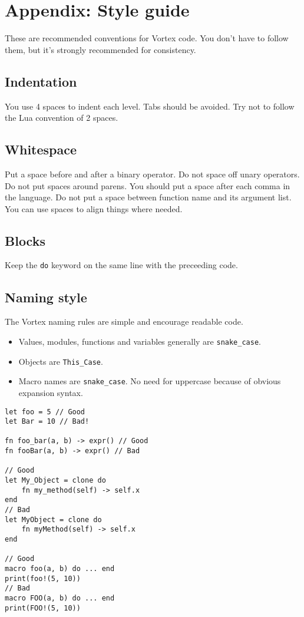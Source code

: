 \documentclass{article}
\begin{document}
\section{Appendix: Style guide}
These are recommended conventions for Vortex code. You don't have to follow
them, but it's strongly recommended for consistency.
\subsection{Indentation}
You use 4 spaces to indent each level. Tabs should be avoided. Try not to
follow the Lua convention of 2 spaces.
\subsection{Whitespace}
Put a space before and after a binary operator. Do not space off unary
operators. Do not put spaces around parens. You should put a space after each
comma in the language. Do not put a space between function name and its
argument list. You can use spaces to align things where needed.
\subsection{Blocks}
Keep the \verb|do| keyword on the same line with the preceeding code.
\subsection{Naming style}
The Vortex naming rules are simple and encourage readable code.
\begin{itemize}
\item Values, modules, functions and variables generally are \verb|snake_case|.
\item Objects are \verb|This_Case|.
\item Macro names are \verb|snake_case|. No need for uppercase because of
obvious expansion syntax.
\end{itemize}
\begin{lstlisting}[language=vortex]
let foo = 5 // Good
let Bar = 10 // Bad!

fn foo_bar(a, b) -> expr() // Good
fn fooBar(a, b) -> expr() // Bad

// Good
let My_Object = clone do
    fn my_method(self) -> self.x
end
// Bad
let MyObject = clone do
    fn myMethod(self) -> self.x
end

// Good
macro foo(a, b) do ... end
print(foo!(5, 10))
// Bad
macro FOO(a, b) do ... end
print(FOO!(5, 10))
\end{lstlisting}
\end{document}

